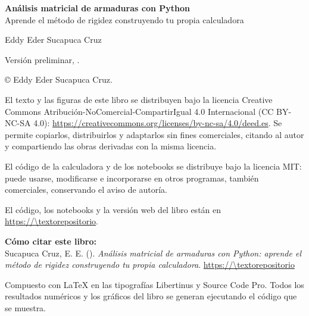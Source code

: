 \thispagestyle{empty}
\null\vfill
{\small\raggedright
\textbf{Análisis matricial de armaduras con Python}\\
Aprende el método de rigidez construyendo tu propia calculadora\par
\medskip
Eddy Eder Sucapuca Cruz\par
Versión preliminar, \the\year.\par
\bigskip
© \the\year{} Eddy Eder Sucapuca Cruz.\par
\medskip
El texto y las figuras de este libro se distribuyen bajo la licencia Creative
Commons Atribución-NoComercial-CompartirIgual 4.0 Internacional (CC BY-NC-SA
4.0): \url{https://creativecommons.org/licenses/by-nc-sa/4.0/deed.es}. Se
permite copiarlos, distribuirlos y adaptarlos sin fines comerciales, citando
al autor y compartiendo las obras derivadas con la misma licencia.\par
\medskip
El código de la calculadora y de los notebooks se distribuye bajo la licencia
MIT: puede usarse, modificarse e incorporarse en otros programas, también
comerciales, conservando el aviso de autoría.\par
\medskip
El código, los notebooks y la versión web del libro están en
\url{https://\textorepositorio}.\par
\bigskip
\textbf{Cómo citar este libro:}\\
Sucapuca Cruz, E. E. (\the\year). \emph{Análisis matricial de armaduras con
Python: aprende el método de rigidez construyendo tu propia calculadora}.
\url{https://\textorepositorio}\par
\bigskip
Compuesto con \LaTeX{} en las tipografías Libertinus y Source Code Pro. Todos
los resultados numéricos y los gráficos del libro se generan ejecutando el
código que se muestra.\par}
\cleardoublepage
